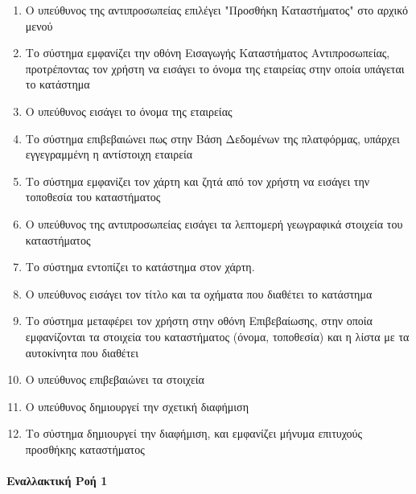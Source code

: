\documentclass{../ol-softwaremanual}
\begin{document}
	\begin{enumerate}
		\item Ο υπεύθυνος της αντιπροσωπείας επιλέγει \en"\gr Προσθήκη Καταστήματος\en" \gr στο αρχικό μενού
		\item Το σύστημα εμφανίζει την οθόνη Εισαγωγής Καταστήματος Αντιπροσωπείας, προτρέποντας τον χρήστη να εισάγει το όνομα της εταιρείας στην οποία υπάγεται το κατάστημα
		\item Ο υπεύθυνος εισάγει το όνομα της εταιρείας
		\item Το σύστημα επιβεβαιώνει πως στην Βάση Δεδομένων της πλατφόρμας, υπάρχει εγγεγραμμένη η αντίστοιχη εταιρεία
		\item Το σύστημα εμφανίζει τον χάρτη και ζητά από τον χρήστη να εισάγει την τοποθεσία του καταστήματος
		\item Ο υπεύθυνος της αντιπροσωπείας εισάγει τα λεπτομερή γεωγραφικά στοιχεία του καταστήματος
		\item Το σύστημα εντοπίζει το κατάστημα στον χάρτη. 
		\item Ο υπεύθυνος εισάγει τον τίτλο και τα οχήματα που διαθέτει το κατάστημα
		\item Το σύστημα μεταφέρει τον χρήστη στην οθόνη Επιβεβαίωσης, στην οποία εμφανίζονται τα στοιχεία του καταστήματος (όνομα, τοποθεσία) και η λίστα με τα αυτοκίνητα που διαθέτει
		\item Ο υπεύθυνος επιβεβαιώνει τα στοιχεία
		\item Ο υπεύθυνος δημιουργεί την σχετική διαφήμιση
		\item Το σύστημα δημιουργεί την διαφήμιση,  και εμφανίζει μήνυμα επιτυχούς προσθήκης καταστήματος
	\end{enumerate}
	
	\paragraph{Εναλλακτική Ροή 1}
	
\end{document}

